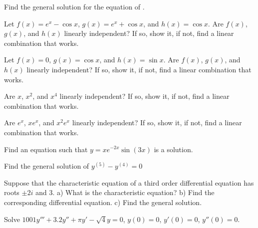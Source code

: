 \documentclass[12pt]{book}
\begin{document}
\begin{exercise}
Find the general solution for the equation of .
\end{exercise}

\begin{exercise}
Let
$f(x) = e^x - \cos x$, $g(x) = e^x + \cos x$, and $h(x) = \cos x$.
Are $f(x)$, $g(x)$, and $h(x)$
linearly independent?  If so, show
it, if not, find a linear combination that works.
\end{exercise}

\begin{exercise}
Let
$f(x) = 0$, $g(x) = \cos x$, and $h(x) = \sin x$.
Are $f(x)$, $g(x)$, and $h(x)$
linearly independent?  If so, show
it, if not, find a linear combination that works.
\end{exercise}

\begin{exercise}
Are $x$, $x^2$, and $x^4$
linearly independent?  If so, show
it, if not, find a linear combination that works.
\end{exercise}

\begin{exercise}
Are $e^x$, $xe^x$, and $x^2e^x$
linearly independent?  If so, show
it, if not, find a linear combination that works.
\end{exercise}

\begin{exercise}
Find an equation such that $y=xe^{-2x}\sin(3x)$ is a solution.
\end{exercise}

\setcounter{exercise}{100}

\begin{exercise}
Find the general solution of $y^{(5)}-y^{(4)}=0$
\end{exercise}

\begin{exercise}
Suppose that the characteristic equation of a third order differential
equation has
roots $\pm 2i$ and 3.  a) What is the characteristic equation?  b) Find the
corresponding differential equation.  c) Find the general solution.
\end{exercise}

\begin{exercise}
Solve $1001y'''+3.2y''+\pi y'-\sqrt{4} y = 0$, $y(0)=0$, $y'(0) = 0$,
$y''(0) = 0$.
\end{exercise}
\end{document}
